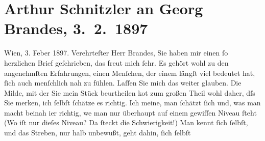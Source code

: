 

               \section[Arthur Schnitzler an Georg Brandes, 3. 2. 1897]{ Arthur Schnitzler an Georg Brandes, 3. 2. 1897}\nopagebreak{}\rehead{ }\begin{ledgroupsized}[t]{13cm}\normalsize\beginnumbering{} \toendnotes[C]{\smallbreak\pagebreak[2]} 
\toendnotes[C]{\smallbreak}\pstart
           \raggedleft{}{\pb}Wien, 3. Feber 1897.\pend
           \pstart{}Verehrteſter Herr Brandes,\pend\pstart
           Sie haben mir einen ſo herzlichen Brief geſchrieben, das freut mich ſehr. Es gehört
               wohl zu den angenehmſten Erfahrungen, einen Menſchen, der einem längſt viel bedeutet
               hat, ſich auch menſchlich nah zu fühlen. Laſſen Sie mich das weiter glauben.\pend
           \pstart
           Die Milde, mit der Sie mein Stück
               beurtheilen ko{\geminationm}t zum großen Theil wohl daher, dſs Sie
               merken, ich ſelbſt ſchätze es richtig. {\pb}Ich meine,
               man ſchätzt ſich und, was man macht beinah i{\geminationm}er richtig,
                  we{\geminationn} man nur überhaupt auf einem gewiſſen Niveau ſteht
               (Wo iſt nur dieſes Niveau? Da ſteckt die Schwierigkeit!) Man kennt ſich ſelbſt, und
               das Streben, nur halb unbewußt, geht dahin, ſich \introOben{}ſelbſt\introOben{}

\end{ledgroupsized}
